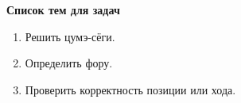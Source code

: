 \documentclass[12pt]{article}
\begin{document}
\begin{CJK}{UTF8}{min}
\bigbreak
\begin{center}\bfseries\large Список тем для задач\end{center}

\begin{enumerate}
\setlength{\parskip}{-0.3ex}\relax
\item Решить цумэ-сёги.
\item Определить фору.
\item Проверить корректность позиции или хода.
\end{enumerate}

\end{CJK}
\end{document}
